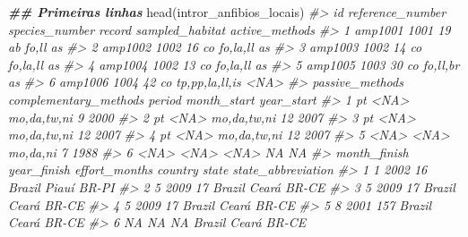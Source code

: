 \documentclass[
]{book}
\newenvironment{Shaded}{\begin{snugshade}}{\end{snugshade}}
\newcommand{\CommentTok}[1]{\textcolor[rgb]{0.37,0.37,0.37}{\textit{#1}}}
\newcommand{\DocumentationTok}[1]{\textcolor[rgb]{0.37,0.37,0.37}{\textbf{\textit{#1}}}}
\newcommand{\FunctionTok}[1]{\textcolor[rgb]{0,0,0}{#1}}
\newcommand{\NormalTok}[1]{#1}
\begin{document}
\begin{Shaded}
\begin{Highlighting}[]
\DocumentationTok{\#\# Primeiras linhas}
\FunctionTok{head}\NormalTok{(intror\_anfibios\_locais)}
\CommentTok{\#\textgreater{}        id reference\_number species\_number record sampled\_habitat active\_methods}
\CommentTok{\#\textgreater{} 1 amp1001             1001             19     ab           fo,ll             as}
\CommentTok{\#\textgreater{} 2 amp1002             1002             16     co        fo,la,ll             as}
\CommentTok{\#\textgreater{} 3 amp1003             1002             14     co        fo,la,ll             as}
\CommentTok{\#\textgreater{} 4 amp1004             1002             13     co        fo,la,ll             as}
\CommentTok{\#\textgreater{} 5 amp1005             1003             30     co        fo,ll,br             as}
\CommentTok{\#\textgreater{} 6 amp1006             1004             42     co  tp,pp,la,ll,is           \textless{}NA\textgreater{}}
\CommentTok{\#\textgreater{}   passive\_methods complementary\_methods      period month\_start year\_start}
\CommentTok{\#\textgreater{} 1              pt                  \textless{}NA\textgreater{} mo,da,tw,ni           9       2000}
\CommentTok{\#\textgreater{} 2              pt                  \textless{}NA\textgreater{} mo,da,tw,ni          12       2007}
\CommentTok{\#\textgreater{} 3              pt                  \textless{}NA\textgreater{} mo,da,tw,ni          12       2007}
\CommentTok{\#\textgreater{} 4              pt                  \textless{}NA\textgreater{} mo,da,tw,ni          12       2007}
\CommentTok{\#\textgreater{} 5            \textless{}NA\textgreater{}                  \textless{}NA\textgreater{}    mo,da,ni           7       1988}
\CommentTok{\#\textgreater{} 6            \textless{}NA\textgreater{}                  \textless{}NA\textgreater{}        \textless{}NA\textgreater{}          NA         NA}
\CommentTok{\#\textgreater{}   month\_finish year\_finish effort\_months country state state\_abbreviation}
\CommentTok{\#\textgreater{} 1            1        2002            16  Brazil Piauí              BR{-}PI}
\CommentTok{\#\textgreater{} 2            5        2009            17  Brazil Ceará              BR{-}CE}
\CommentTok{\#\textgreater{} 3            5        2009            17  Brazil Ceará              BR{-}CE}
\CommentTok{\#\textgreater{} 4            5        2009            17  Brazil Ceará              BR{-}CE}
\CommentTok{\#\textgreater{} 5            8        2001           157  Brazil Ceará              BR{-}CE}
\CommentTok{\#\textgreater{} 6           NA          NA            NA  Brazil Ceará              BR{-}CE}

\end{Highlighting}
\end{Shaded}
\end{document}
